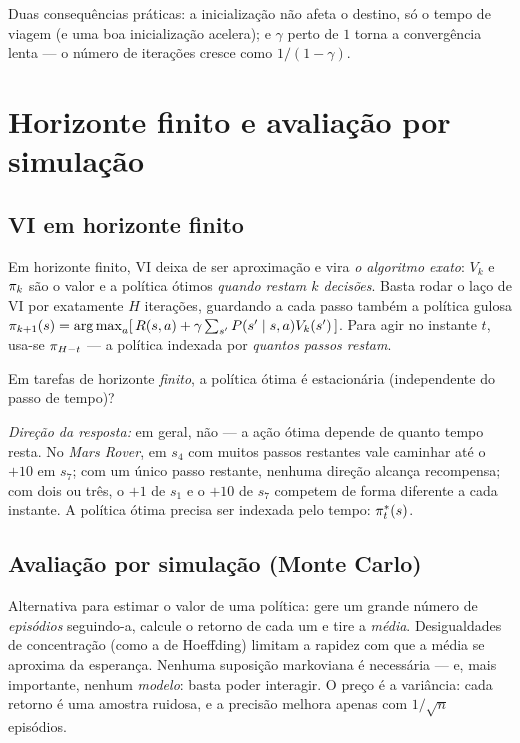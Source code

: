 \documentclass[11pt, a4paper]{article}
\begin{document}
Duas consequências práticas: a inicialização não afeta o destino, só o tempo de viagem
(e uma boa inicialização acelera); e $\gamma$ perto de $1$ torna a convergência lenta
--- o número de iterações cresce como $1/(1-\gamma)$.

\section{Horizonte finito e avaliação por simulação}

\subsection{VI em horizonte finito}

Em horizonte finito, VI deixa de ser aproximação e vira \emph{o algoritmo exato}:
$V_k$ e $\pi_k$ são o valor e a política ótimos \emph{quando restam $k$ decisões}.
Basta rodar o laço de VI por exatamente $H$ iterações, guardando a cada passo também a
política gulosa $\pi_{k+1}(s) = \operatorname*{arg\,max}_a [\, R(s,a) + \gamma \sum_{s'} P(s'\mid s,a) V_k(s') \,]$.
Para agir no instante $t$, usa-se $\pi_{H-t}$ --- a política indexada por \emph{quantos
passos restam}.

\begin{discbox}
Em tarefas de horizonte \emph{finito}, a política ótima é estacionária (independente do
passo de tempo)?
\smallskip

\emph{Direção da resposta:} em geral, não --- a ação ótima depende de quanto tempo
resta. No \emph{Mars Rover}, em $s_4$ com muitos passos restantes vale caminhar até o
$+10$ em $s_7$; com um único passo restante, nenhuma direção alcança recompensa; com
dois ou três, o $+1$ de $s_1$ e o $+10$ de $s_7$ competem de forma diferente a cada
instante. A política ótima precisa ser indexada pelo tempo: $\pi_t^*(s)$.
\end{discbox}

\subsection{Avaliação por simulação (Monte Carlo)}

Alternativa para estimar o valor de uma política: gere um grande número de
\emph{episódios} seguindo-a, calcule o retorno de cada um e tire a \emph{média}.
Desigualdades de concentração (como a de Hoeffding) limitam a rapidez com que a média se
aproxima da esperança. Nenhuma suposição markoviana é necessária --- e, mais importante,
nenhum \emph{modelo}: basta poder interagir. O preço é a variância: cada retorno é uma
amostra ruidosa, e a precisão melhora apenas com $1/\sqrt{n}$ episódios.
\end{document}
